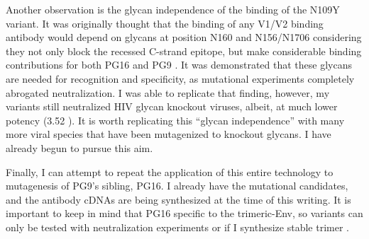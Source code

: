 Another observation is the glycan independence of the binding of the N109Y variant. It was originally thought that the binding of any V1/V2 binding antibody would depend on glycans at position N160 and N156/N1706 considering they not only block the recessed C-strand epitope, but make considerable binding contributions for both PG16 and PG9 \citep{McLellan:2011dg,Pancera:2013ev}. It was demonstrated that these glycans are needed for recognition and specificity, as mutational experiments completely abrogated neutralization. I was able to replicate that finding, however, my variants still neutralized HIV glycan knockout viruses, albeit, at much lower potency (3.52 \mcml). It is worth replicating this ``glycan independence'' with many more viral species that have been mutagenized to knockout glycans. I have already begun to pursue this aim.

Finally, I can attempt to repeat the application of this entire technology to mutagenesis of PG9's sibling, PG16. I already have the mutational candidates, and the antibody cDNAs are being synthesized at the time of this writing. It is important to keep in mind that PG16 specific to the trimeric-Env, so variants can only be tested with neutralization experiments or if I synthesize stable trimer \citep{Sanders:2013gm}.




